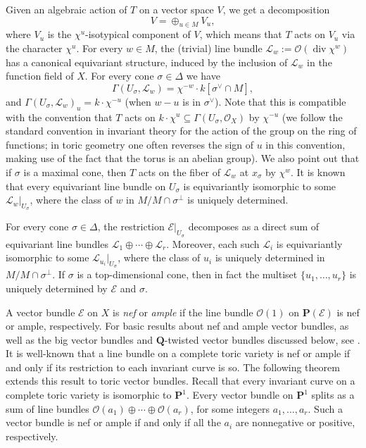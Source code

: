 \documentclass[12pt]{amsart}
\theoremstyle{definition}
\theoremstyle{remark}
\begin{document}
Given an algebraic action of $T$ on a vector space $V$, we get a
decomposition
$$V=\oplus_{u\in M}V_u,$$
where $V_u$ is the $\chi^u$-isotypical component of $V$, which means that $T$
acts on $V_u$ via the character $\chi^u$. For every $w\in M$, the
(trivial) line bundle ${\mathcal{L}}_w:={\mathcal{O}}(\operatorname{div}\chi^{w})$ has a
canonical equivariant structure, induced by the inclusion of ${\mathcal{L}}_w$
in the function field of $X$. For every cone $\sigma\in\Delta$ we
have
$$\Gamma(U_{\sigma},{\mathcal{L}}_w)=\chi^{-w}\cdot k[\sigma^{\vee}\cap M],$$
and $\Gamma(U_{\sigma},{\mathcal{L}}_w)_u=k\cdot\chi^{-u}$ (when
$w-u$ is in $\sigma^{\vee}$). Note that this is compatible with the 
convention that $T$ acts on $k\cdot\chi^u\subseteq
\Gamma(U_{\sigma},{\mathcal{O}}_X)$ by $\chi^{-u}$ (we follow the standard convention
in invariant theory for the action of the group on the ring of functions; in toric geometry
one often reverses the sign of $u$ in this convention, making use of the fact that the torus is an abelian group). We also point out that if
$\sigma$ is a maximal cone, then $T$ acts on the fiber of ${\mathcal{L}}_w$ at
$x_{\sigma}$ by $\chi^{w}$. It is known that every equivariant line
bundle on $U_{\sigma}$ is equivariantly isomorphic to some
${\mathcal{L}}_w\vert_{U_{\sigma}}$, where the class of $w$ in
$M/M\cap\sigma^{\perp}$ is uniquely determined.

For every cone $\sigma\in\Delta$, the restriction
${\mathcal{E}}\vert_{U_{\sigma}}$ decomposes as a direct sum of equivariant
line bundles ${\mathcal{L}}_1\oplus\cdots\oplus{\mathcal{L}}_r$. Moreover, each such
${\mathcal{L}}_i$ is equivariantly isomorphic to some
${\mathcal{L}}_{u_i}\vert_{U_{\sigma}}$, where the class of $u_i$ is uniquely
determined in $M/M\cap\sigma^{\perp}$. If $\sigma$ is a
top-dimensional cone, then in fact the multiset $\{u_1,\ldots,u_r\}$
is uniquely determined by ${\mathcal{E}}$ and $\sigma$.

\bigskip

A vector bundle ${\mathcal{E}}$ on $X$ is \emph{nef} or \emph{ample} if the line bundle ${\mathcal{O}}(1)$ on ${{\mathbf P}}({\mathcal{E}})$ is nef or ample,
respectively.  For basic results about nef and ample vector bundles,
as well as the big vector bundles and ${{\mathbf Q}}$-twisted vector bundles discussed below,
see \cite[Chapter~6]{positivity}.  It is well-known that a line bundle on a complete
toric variety is nef or ample if and only if its restriction to each invariant curve is so.
The following theorem extends this result to toric vector bundles.  Recall that every invariant
curve on a complete toric variety is isomorphic to ${{\mathbf P}}^1$. Every vector bundle on
${{\mathbf P}}^1$ splits as a sum of line bundles
${\mathcal{O}}(a_1)\oplus\cdots \oplus{\mathcal{O}}(a_r)$, for some integers
$a_1, \ldots, a_r$. Such a vector bundle is nef or ample if and only if all the $a_i$ are nonnegative or positive, respectively.
\end{document}
